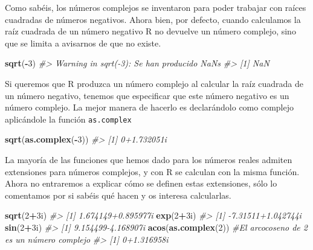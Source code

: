 \documentclass[
]{book}
\newenvironment{Shaded}{\begin{snugshade}}{\end{snugshade}}
\newcommand{\CommentTok}[1]{\textcolor[rgb]{0.56,0.35,0.01}{\textit{#1}}}
\newcommand{\DecValTok}[1]{\textcolor[rgb]{0.00,0.00,0.81}{#1}}
\newcommand{\KeywordTok}[1]{\textcolor[rgb]{0.13,0.29,0.53}{\textbf{#1}}}
\newcommand{\NormalTok}[1]{#1}
\newcommand{\OperatorTok}[1]{\textcolor[rgb]{0.81,0.36,0.00}{\textbf{#1}}}
\theoremstyle{definition}
\theoremstyle{definition}
\theoremstyle{definition}
\theoremstyle{remark}
\begin{document}
Como sabéis, los números complejos se inventaron para poder trabajar con raíces cuadradas de números negativos. Ahora bien, por defecto, cuando calculamos la raíz cuadrada de un número negativo R no devuelve un número complejo, sino que se limita a avisarnos de que no existe.

\begin{Shaded}
\begin{Highlighting}[]
\KeywordTok{sqrt}\NormalTok{(}\OperatorTok{{-}}\DecValTok{3}\NormalTok{)}
\CommentTok{\#\textgreater{} Warning in sqrt({-}3): Se han producido NaNs}
\CommentTok{\#\textgreater{} [1] NaN}
\end{Highlighting}
\end{Shaded}

Si queremos que R produzca un número complejo al calcular la raíz cuadrada de un número negativo, tenemos que especificar que este número negativo es un número complejo. La mejor manera de hacerlo es declarándolo como complejo aplicándole la función \texttt{as.complex}

\begin{Shaded}
\begin{Highlighting}[]
\KeywordTok{sqrt}\NormalTok{(}\KeywordTok{as.complex}\NormalTok{(}\OperatorTok{{-}}\DecValTok{3}\NormalTok{))}
\CommentTok{\#\textgreater{} [1] 0+1.732051i}
\end{Highlighting}
\end{Shaded}

La mayoría de las funciones que hemos dado para los números reales admiten extensiones para números complejos, y con R se calculan con la misma función. Ahora no entraremos a explicar cómo se definen estas extensiones, sólo lo comentamos por si sabéis qué hacen y os interesa calcularlas.

\begin{Shaded}
\begin{Highlighting}[]
\KeywordTok{sqrt}\NormalTok{(}\DecValTok{2}\OperatorTok{+}\NormalTok{3i)}
\CommentTok{\#\textgreater{} [1] 1.674149+0.895977i}
\KeywordTok{exp}\NormalTok{(}\DecValTok{2}\OperatorTok{+}\NormalTok{3i)}
\CommentTok{\#\textgreater{} [1] {-}7.31511+1.042744i}
\KeywordTok{sin}\NormalTok{(}\DecValTok{2}\OperatorTok{+}\NormalTok{3i)}
\CommentTok{\#\textgreater{} [1] 9.154499{-}4.168907i}
\KeywordTok{acos}\NormalTok{(}\KeywordTok{as.complex}\NormalTok{(}\DecValTok{2}\NormalTok{)) }\CommentTok{\#El arcocoseno de 2 es un número complejo}
\CommentTok{\#\textgreater{} [1] 0+1.316958i}
\end{Highlighting}
\end{Shaded}
\end{document}
